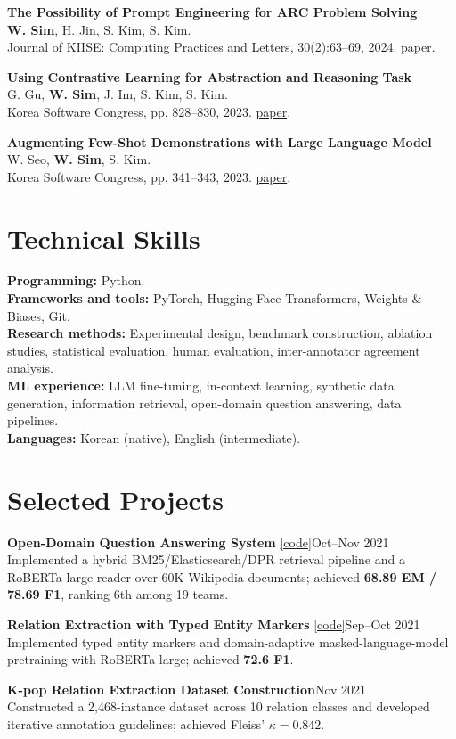 \documentclass[10pt,a4paper]{article}
\newcommand{\pub}[2]{\noindent #1\\{\small #2}\par\vspace{2pt}}
\begin{document}
\pub{\textbf{The Possibility of Prompt Engineering for ARC Problem Solving}}
{\textbf{W. Sim}, H. Jin, S. Kim, S. Kim.\\
Journal of KIISE: Computing Practices and Letters, 30(2):63--69, 2024.
\href{https://www.dbpia.co.kr/journal/articleDetail?nodeId=NODE11716261}{paper}.}

\pub{\textbf{Using Contrastive Learning for Abstraction and Reasoning Task}}
{G. Gu, \textbf{W. Sim}, J. Im, S. Kim, S. Kim.\\
Korea Software Congress, pp. 828--830, 2023.
\href{https://www.dbpia.co.kr/journal/articleDetail?nodeId=NODE11705255}{paper}.}

\pub{\textbf{Augmenting Few-Shot Demonstrations with Large Language Model}}
{W. Seo, \textbf{W. Sim}, S. Kim.\\
Korea Software Congress, pp. 341--343, 2023.
\href{https://www.dbpia.co.kr/journal/articleDetail?nodeId=NODE11705093}{paper}.}

\section{Technical Skills}
\textbf{Programming:} Python.\\
\textbf{Frameworks and tools:} PyTorch, Hugging Face Transformers, Weights \& Biases, Git.\\
\textbf{Research methods:} Experimental design, benchmark construction, ablation studies,
statistical evaluation, human evaluation, inter-annotator agreement analysis.\\
\textbf{ML experience:} LLM fine-tuning, in-context learning, synthetic data generation,
information retrieval, open-domain question answering, data pipelines.\\
\textbf{Languages:} Korean (native), English (intermediate).

\section{Selected Projects}
\textbf{Open-Domain Question Answering System}
\href{https://github.com/whatchang/mrc-level2-nlp-04}{[code]}\hfill Oct--Nov 2021\\
Implemented a hybrid BM25/Elasticsearch/DPR retrieval pipeline and a RoBERTa-large
reader over 60K Wikipedia documents; achieved \textbf{68.89 EM / 78.69 F1},
ranking 6th among 19 teams.\par
\textbf{Relation Extraction with Typed Entity Markers}
\href{https://github.com/whatchang/klue-level2-nlp-04}{[code]}\hfill Sep--Oct 2021\\
Implemented typed entity markers and domain-adaptive masked-language-model
pretraining with RoBERTa-large; achieved \textbf{72.6 F1}.\par
\textbf{K-pop Relation Extraction Dataset Construction}\hfill Nov 2021\\
Constructed a 2,468-instance dataset across 10 relation classes and developed
iterative annotation guidelines; achieved Fleiss' $\kappa = 0.842$.
\end{document}
